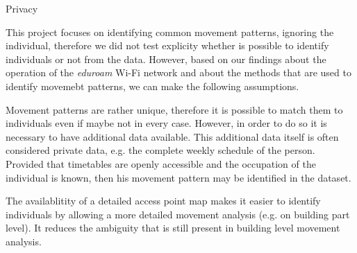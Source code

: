 Privacy

This project focuses on identifying common movement patterns, ignoring
the individual, therefore we did not test explicity whether is possible to
identify individuals or not from the data. However, based on our findings about
the operation of the \textit{eduroam} Wi-Fi network and about the methods that
are used to identify movemebt patterns, we can make the following assumptions.

Movement patterns are rather unique, therefore it is possible to match them to
individuals even if maybe not in every case. However, in order to do so it is
necessary to have additional data available. This additional data itself is
often considered private data, e.g. the complete weekly schedule of the person.
Provided that timetables are openly accessible and the occupation of the
individual is known, then his movement pattern may be identified in the dataset.

The availablitity of a detailed access point map makes it easier to identify
individuals by allowing a more detailed movement analysis (e.g. on building part
level). It reduces the ambiguity that is still present in building level
movement analysis.



